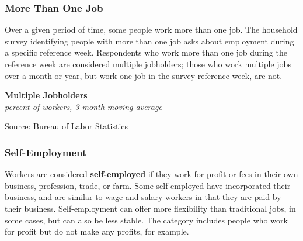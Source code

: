 \documentclass{report}
\makeatletter
\newcommand{\tbllink}[1]{\href{https://raw.githubusercontent.com/bdecon/US-chartbook/master/chartbook/data/#1}{\faTable}}
\newcommand*\short[1]{\expandafter\@gobbletwo\number\numexpr#1\relax}
\newcommand{\shdateaxisticks}{
		date coordinates in=x, axis line style={draw=none},
		xmax={2024-01-31},
		max space between ticks=40,	    
		xtick={{1990-01-01}, {1995-01-01}, {2000-01-01}, 
			{2005-01-01}, {2010-01-01}, {2015-01-01}, {2020-01-01}},
		minor xtick={},
		enlarge y limits={0.06}, enlarge x limits={0.01},
		xticklabel style={align=center, yshift=-2pt}, tick label style={inner sep=0pt},
		}
\newcommand{\stdline}[4]{\addplot[very thick, no markers, color=#1] 
		table [x=#2, y=#3, col sep=comma] {#4};	}
\newcommand{\rebars}{
		\fill[color=black!10] (axis cs:{2007-12-01},\pgfkeysvalueof{/pgfplots/ymin}) 
			rectangle (axis cs:{2009-07-01}, \pgfkeysvalueof{/pgfplots/ymax});
		\fill[color=black!10] (axis cs:{2001-03-01},\pgfkeysvalueof{/pgfplots/ymin}) 
			rectangle (axis cs:{2001-11-01}, \pgfkeysvalueof{/pgfplots/ymax});
		\fill[color=black!10] (axis cs:{2020-02-01},\pgfkeysvalueof{/pgfplots/ymin}) 
			rectangle (axis cs:{2020-05-01}, \pgfkeysvalueof{/pgfplots/ymax});}
\makeatother
\begin{document}
{\begin{minipage}{1.0\textwidth}
\subsubsection*{More Than One Job}
\small Over a given period of time, some people work more than one job. The household survey identifying people with more than one job asks about employment during a specific reference week. Respondents who work more than one job during the reference week are considered multiple jobholders; those who work multiple jobs over a month or year, but work one job in the survey reference week, are not. 
\end{minipage}

\begin{minipage}{0.42\textwidth}
\normalsize \textbf{Multiple Jobholders}\\
\footnotesize{\textit{percent of workers, 3-month moving average}}
\vspace{2.8cm}

\hspace{2mm} 

\footnotesize{Source: Bureau of Labor Statistics} \hfill \tbllink{mjh.csv} \ \
\end{minipage} \hspace{5mm}
\begin{minipage}{0.3\textwidth}
\small 
\end{minipage}
\newpage
\begin{minipage}{1.0\textwidth}
\subsubsection*{Self-Employment}
\small Workers are considered \textbf{self-employed} if they work for profit or fees in their own business, profession, trade, or farm. Some self-employed have incorporated their business, and are similar to wage and salary workers in that they are paid by their business. Self-employment can offer more flexibility than traditional jobs, in some cases, but can also be less stable. The category includes people who work for profit but do not make any profits, for example. 


\end{minipage}}
\end{document}
